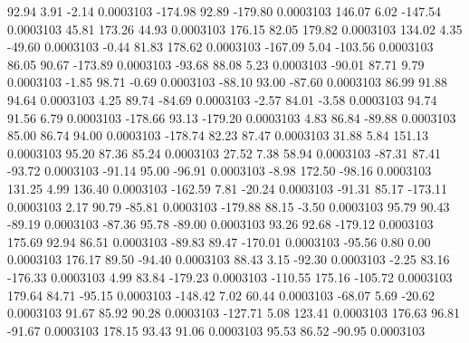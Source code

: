        92.94        3.91       -2.14     0.0003103
     -174.98       92.89     -179.80     0.0003103
      146.07        6.02     -147.54     0.0003103
       45.81      173.26       44.93     0.0003103
      176.15       82.05      179.82     0.0003103
      134.02        4.35      -49.60     0.0003103
       -0.44       81.83      178.62     0.0003103
     -167.09        5.04     -103.56     0.0003103
       86.05       90.67     -173.89     0.0003103
      -93.68       88.08        5.23     0.0003103
      -90.01       87.71        9.79     0.0003103
       -1.85       98.71       -0.69     0.0003103
      -88.10       93.00      -87.60     0.0003103
       86.99       91.88       94.64     0.0003103
        4.25       89.74      -84.69     0.0003103
       -2.57       84.01       -3.58     0.0003103
       94.74       91.56        6.79     0.0003103
     -178.66       93.13     -179.20     0.0003103
        4.83       86.84      -89.88     0.0003103
       85.00       86.74       94.00     0.0003103
     -178.74       82.23       87.47     0.0003103
       31.88        5.84      151.13     0.0003103
       95.20       87.36       85.24     0.0003103
       27.52        7.38       58.94     0.0003103
      -87.31       87.41      -93.72     0.0003103
      -91.14       95.00      -96.91     0.0003103
       -8.98      172.50      -98.16     0.0003103
      131.25        4.99      136.40     0.0003103
     -162.59        7.81      -20.24     0.0003103
      -91.31       85.17     -173.11     0.0003103
        2.17       90.79      -85.81     0.0003103
     -179.88       88.15       -3.50     0.0003103
       95.79       90.43      -89.19     0.0003103
      -87.36       95.78      -89.00     0.0003103
       93.26       92.68     -179.12     0.0003103
      175.69       92.94       86.51     0.0003103
      -89.83       89.47     -170.01     0.0003103
      -95.56        0.80        0.00     0.0003103
      176.17       89.50      -94.40     0.0003103
       88.43        3.15      -92.30     0.0003103
       -2.25       83.16     -176.33     0.0003103
        4.99       83.84     -179.23     0.0003103
     -110.55      175.16     -105.72     0.0003103
      179.64       84.71      -95.15     0.0003103
     -148.42        7.02       60.44     0.0003103
      -68.07        5.69      -20.62     0.0003103
       91.67       85.92       90.28     0.0003103
     -127.71        5.08      123.41     0.0003103
      176.63       96.81      -91.67     0.0003103
      178.15       93.43       91.06     0.0003103
       95.53       86.52      -90.95     0.0003103
